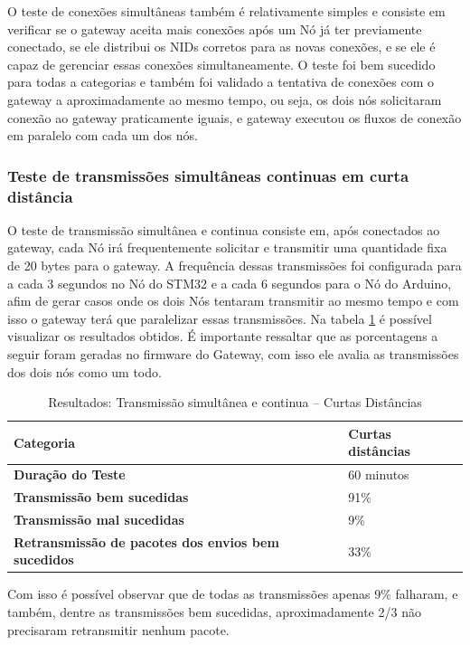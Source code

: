 O teste de conexões simultâneas também é relativamente simples e consiste em verificar
se o gateway aceita mais conexões após um Nó já ter previamente conectado, se ele
distribui os NIDs corretos para as novas conexões, e se ele é capaz de gerenciar
essas conexões simultaneamente. O teste foi bem sucedido para todas a categorias
e também foi validado a tentativa de conexões com o gateway a aproximadamente ao mesmo tempo,
ou seja, os dois nós solicitaram conexão ao gateway praticamente iguais, e gateway
executou os fluxos de conexão em paralelo com cada um dos nós.

\newpage

\subsubsection{Teste de transmissões simultâneas continuas em curta distância}

O teste de transmissão simultânea e continua consiste em, após conectados ao gateway, cada
Nó irá frequentemente solicitar e transmitir uma quantidade fixa de 20 bytes para o gateway.
A frequência dessas transmissões foi configurada para a cada 3 segundos no Nó do STM32
e a cada 6 segundos para o Nó do Arduino, afim de gerar casos onde os dois Nós tentaram
transmitir ao mesmo tempo e com isso o gateway terá que paralelizar essas transmissões.
Na tabela \ref{tab:result-short} é possível visualizar os resultados obtidos. É importante
ressaltar que as porcentagens a seguir foram geradas no firmware do Gateway, com isso
ele avalia as transmissões dos dois nós como um todo.

\begin{longtable}{|l|l|}
    \caption{Resultados: Transmissão simultânea e continua -- Curtas Distâncias}\label{tab:result-short}\\
    \hline
    \textbf{Categoria} & Curtas distâncias \\
    \hline
    \textbf{Duração do Teste} & 60 minutos \\
    \hline
    \textbf{Transmissão bem sucedidas} & 91\% \\
    \hline
    \textbf{Transmissão mal sucedidas} & 9\% \\
    \hline
    \textbf{Retransmissão de pacotes dos envios bem sucedidos} & 33\% \\
    \hline
\end{longtable}

Com isso é possível observar que de todas as transmissões apenas 9\% falharam, e também,
dentre as transmissões bem sucedidas, aproximadamente 2/3 não precisaram retransmitir nenhum
pacote.

